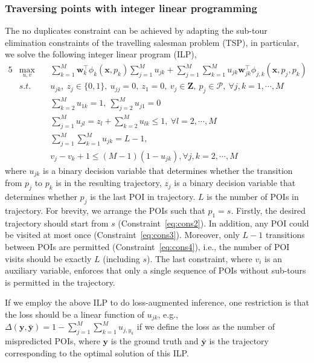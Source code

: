 \subsubsection{Traversing points with integer linear programming}
The no duplicates constraint can be achieved by adapting the sub-tour elimination constraints of the travelling salesman problem (TSP),
in particular, we solve the following integer linear program (ILP),
\begin{alignat}{5}
& \max_{u,v} ~&& \sum_{k=1}^M \mathbf{w}_k^\top \phi_k(\mathbf{x}, p_k) \sum_{j=1}^M u_{jk} + 
                 \sum_{j=1}^M \sum_{k=1}^M u_{jk} \mathbf{w}_{jk}^\top \phi_{j, k}(\mathbf{x}, p_j, p_k) \\
& s.t. ~~ ~&& u_{jk}, ~z_j \in \{0, 1\}, ~u_{jj}=0, ~z_1=0, ~v_j \in \mathbf{Z},~ p_j \in \mathcal{P}, ~\forall j, k = 1,\cdots,M   \label{eq:cons1} \\
&          && \sum_{k=2}^M u_{1k} = 1, ~\sum_{j=2}^M u_{j1} = 0  \label{eq:cons2} \\
&          && \sum_{j=1}^M u_{jl} = z_l + \sum_{k=2}^M u_{lk} \le 1,   ~\forall l=2,\cdots,M                    \label{eq:cons3} \\
&          && \sum_{j=1}^M \sum_{k=1}^M u_{jk} = L-1,                                                           \label{eq:cons4} \\
&          && v_j - v_k + 1 \le (M-1) (1-u_{jk}),                     \forall j,k=2,\cdots,M                    \label{eq:cons5}
\end{alignat}
where $u_{jk}$ is a binary decision variable that determines whether the transition from $p_j$ to $p_k$ is in the resulting trajectory,
$z_j$ is a binary decision variable that determines whether $p_j$ is the last POI in trajectory.
$L$ is the number of POIs in trajectory.
For brevity, we arrange the POIs such that $p_1 = s$.
Firstly, the desired trajectory should start from $s$ (Constraint~\ref{eq:cons2}).
In addition, any POI could be visited at most once (Constraint~\ref{eq:cons3}).
Moreover, only $L-1$ transitions between POIs are permitted (Constraint~\ref{eq:cons4}),
i.e., the number of POI visits should be exactly $L$ (including $s$).
The last constraint, where $v_i$ is an auxiliary variable,
enforces that only a single sequence of POIs without sub-tours is permitted in the trajectory.

If we employ the above ILP to do loss-augmented inference, one restriction is that the loss should be a linear function of $u_{jk}$,
e.g., $\Delta(\mathbf{y}, \bar{\mathbf{y}}) = 1 - \sum_{j=1}^M \sum_{k=1}^M u_{j, y_k}$ if we define the loss as the number of mispredicted POIs,
where $\mathbf{y}$ is the ground truth and $\bar{\mathbf{y}}$ is the trajectory corresponding to the optimal solution of this ILP.

